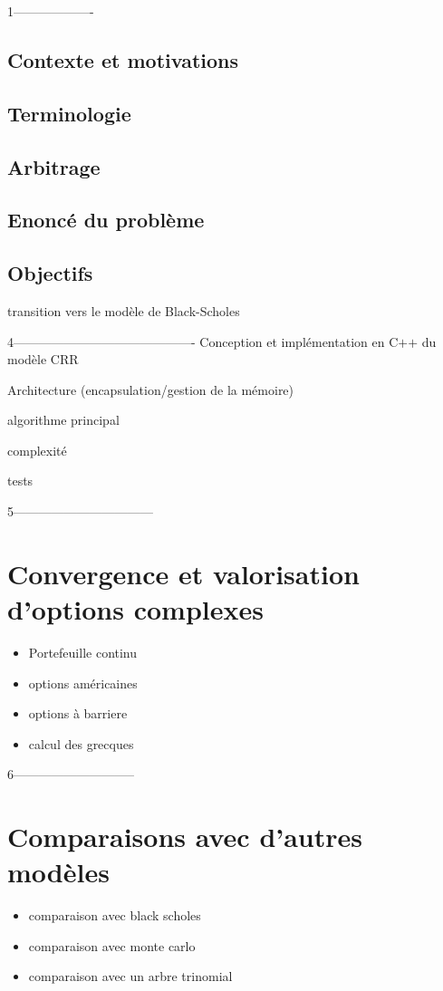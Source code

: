 1-------------------
\subsection{Contexte et motivations}
\subsection{Terminologie}
\subsection{Arbitrage}
\subsection{Enoncé du problème}
\subsection{Objectifs}

transition vers le modèle de Black-Scholes

4-------------------------------------------
Conception et implémentation en C$\texttt{++}$ du modèle CRR
    \item Architecture (encapsulation/gestion de la mémoire)
    \item algorithme principal
    \item complexité
    \item tests


5---------------------------------
\section{Convergence et valorisation d'options complexes}
\begin{itemize}
    \item Portefeuille continu
    \item options américaines
    \item options à barriere
    \item calcul des grecques
\end{itemize}


6-----------------------------
\section{Comparaisons avec d'autres modèles}
\begin{itemize}
    \item comparaison avec black scholes
    \item comparaison avec monte carlo
    \item comparaison avec un arbre trinomial
\end{itemize}



